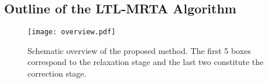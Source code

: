 \documentclass[journal]{IEEEtran}
\newcommand{\ltl}{ {\it LTL}$_{-\bigcirc}$ }
\begin{document}
\subsection{Outline of the LTL-MRTA Algorithm}
 \begin{figure*}[!t]
   \centering
\texttt{[image: overview.pdf]}
   \caption{Schematic overview of the proposed method.  The first 5 boxes correspond to the relaxation stage and the last two constitute the correction stage.}
\label{fig:overview}
 \end{figure*}
\end{document}
